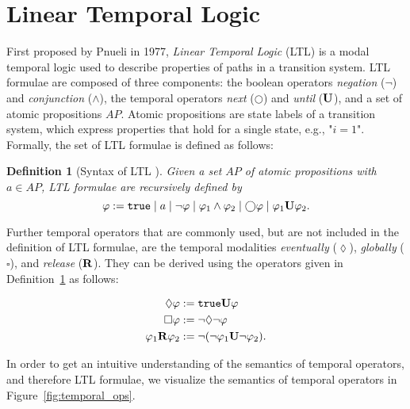 \documentclass[a4paper, 12pt, twoside]{report}
\theoremstyle{plain}
\newtheorem{definition}[theorem]{Definition}
\begin{document}
	\section{Linear Temporal Logic}
	 
	First proposed by Pnueli in 1977, \textit{Linear Temporal Logic} (LTL) is a modal temporal logic used to describe properties of paths in a transition system. LTL formulae are composed of three components: the boolean operators \textit{negation} ($\neg$) and \textit{conjunction} ($\wedge$), the temporal operators \textit{next} ($\bigcirc$) and \textit{until} ($\textbf{\textup{U}}$), and a set of atomic propositions $AP$. Atomic propositions are state labels of a transition system, which express properties that hold for a single state, e.g., "$i=1$". Formally, the set of LTL formulae is defined as follows:
	
	\begin{definition}[Syntax of LTL \cite{baier2008principles}]\label{def:ltl_syntax}
		Given a set $AP$ of atomic propositions with $a \in AP$, \textup{LTL formulae} are recursively defined by
		\begin{equation*}		
			\varphi := \texttt{\textup{true}} \mid a \mid \neg \varphi \mid \varphi_1 \wedge \varphi_2 \mid \bigcirc \varphi \mid \varphi_1 \textbf{\textup{U}} \varphi_2.
		\end{equation*}
	\end{definition}

	Further temporal operators that are commonly used, but are not included in the definition of LTL formulae, are the temporal modalities \textit{eventually}  ($\lozenge$), \textit{globally} ($\square$), and \textit{release} ($\textbf{\textup{R}}$). They can be derived using the operators given in Definition~\ref{def:ltl_syntax} as follows: 
	
	\begin{align*}		
		\lozenge \varphi &:= \texttt{\textup{true}} \textbf{\textup{U}} \varphi\\
		\square \varphi &:= \neg \lozenge\neg\varphi\\
		\varphi_1 \textbf{\textup{R}} \varphi_2 &:= \neg(\neg\varphi_1 \textbf{\textup{U}} \neg \varphi_2).
	\end{align*}
	
	In order to get an intuitive understanding of the semantics of temporal operators, and therefore LTL formulae, we visualize the semantics of temporal operators in Figure~\ref{fig:temporal_ops}.
	
\end{document}
